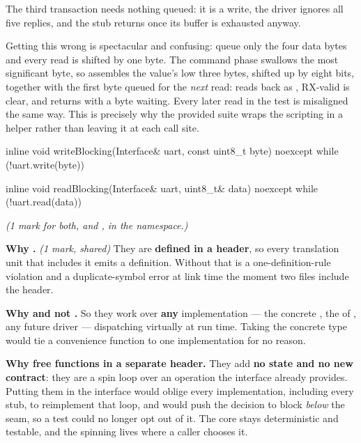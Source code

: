 The third transaction needs nothing queued: it is a write, the driver ignores all five replies, and
the stub returns  once its buffer is exhausted anyway.

Getting this wrong is spectacular and confusing: queue only the four data bytes and every read is
shifted by one byte. The command phase swallows the most significant byte, so 
assembles the value's low three bytes, shifted up by eight bits, together with the first byte queued
for the \emph{next} read:  reads back as , RX-valid is clear, and
 returns  with a byte waiting. Every later read in the test is misaligned
the same way. This is precisely why the provided suite wraps the scripting in a
 helper rather than leaving it at each call site.

\begin{cppcode}
inline void writeBlocking(Interface& uart, const uint8_t byte) noexcept
{
    while (!uart.write(byte)) {}
}

inline void readBlocking(Interface& uart, uint8_t& data) noexcept
{
    while (!uart.read(data)) {}
}
\end{cppcode}

{\itshape (1 mark for both,  and , in the 
namespace.)\par}

\medskip
\textbf{Why .} \textit{(1 mark, shared)} They are \textbf{defined in a header}, so every
translation unit that includes it emits a definition. Without  that is a
one-definition-rule violation and a duplicate-symbol error at link time the moment two files include
the header.

\textbf{Why  and not .} So they work over \textbf{any} implementation
--- the concrete , the  of , any future driver ---
dispatching virtually at run time. Taking the concrete type would tie a convenience function to one
implementation for no reason.

\textbf{Why free functions in a separate header.} They add \textbf{no state and no new contract}:
they are a spin loop over an operation the interface already provides. Putting them in the interface
would oblige every implementation, including every stub, to reimplement that loop, and would push the
decision to block \emph{below} the seam, so a test could no longer opt out of it. The core stays
deterministic and testable, and the spinning lives where a caller chooses it.

